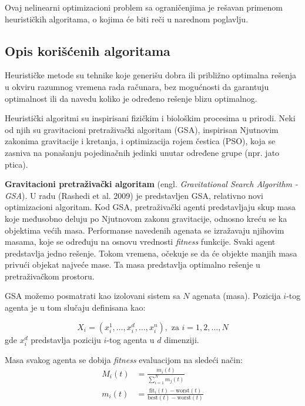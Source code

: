 Ovaj nelinearni optimizacioni problem sa ograničenjima je rešavan primenom heurističkih algoritama, o kojima će biti reči u narednom poglavlju.

\subsection{Opis korišćenih algoritama}

Heurističke metode su tehnike koje generišu dobra ili približno optimalna rešenja u okviru razumnog vremena rada računara, bez mogućnosti da garantuju optimalnost ili da navedu koliko je određeno rešenje blizu optimalnog.

Heuristički algoritmi su inspirisani fizičkim i biološkim procesima u prirodi. Neki od njih su gravitacioni pretraživački algoritam (GSA), inspirisan Njutnovim zakonima gravitacije i kretanja, i optimizacija rojem čestica (PSO), koja se zasniva na ponašanju pojedinačnih jedinki unutar određene grupe (npr. jato ptica).

\textbf{Gravitacioni pretraživački algoritam} (engl. \emph{Gravitational Search Algorithm - GSA}). U radu (Rashedi et al. 2009) je predstavljen GSA, relativno novi optimizacioni algoritam. Kod GSA, pretraživački agenti predstavljaju skup masa koje međusobno deluju po Njutnovom zakonu gravitacije, odnosno kreću se ka objektima većih masa. Performanse navedenih agenata se izražavaju njihovim masama, koje se određuju na osnovu vrednosti \emph{fitness} funkcije. Svaki agent predstavlja jedno rešenje. Tokom vremena, očekuje se da će objekte manjih masa privući objekat najveće mase. Ta masa predstavlja optimalno rešenje u pretraživačkom prostoru.

GSA možemo posmatrati kao izolovani sistem sa $N$ agenata (masa). Pozicija $i$-tog agenta je u tom slučaju definisana kao:

\begin{equation*}
    X_i = (x_i^1, \dots, x_i^d, \dots, x_i^n), \mbox{ za } i = 1, 2, \dots, N
\end{equation*}
gde $x_i^d$ predstavlja poziciju $i$-tog agenta u $d$ dimenziji.

Masa svakog agenta se dobija \emph{fitness} evaluacijom na sledeći način:
\begin{align}
    M_i(t) &= \frac{m_i(t)}{\sum_{i=1}^{N} m_j(t)} \\
    m_i(t) &= \frac{\mathrm{fit}_i(t) - \mathrm{worst}(t)}{\mathrm{best}(t) - \mathrm{worst}(t)} \nonumber
\end{align}

